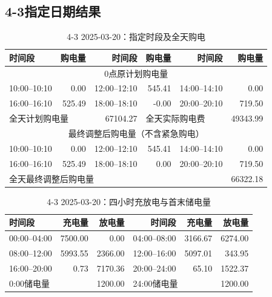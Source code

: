 \FloatBarrier
\subsection{4-3指定日期结果}
\begin{table}[htbp]\centering\scriptsize
\caption{4-3 2025-03-20：指定时段及全天购电}
\begin{tabular}{lrrrrr}\toprule
时间段 & 购电量 & 时间段 & 购电量 & 时间段 & 购电量\\\midrule
\multicolumn{6}{c}{0点原计划购电量}\\
10:00--10:10 & 0.00 & 12:00--12:10 & 545.41 & 14:00--14:10 & 0.00\\
16:00--16:10 & 525.49 & 18:00--18:10 & -0.00 & 20:00--20:10 & 719.50\\
\multicolumn{2}{l}{全天计划购电量} & 67104.27 & \multicolumn{2}{l}{全天实际购电费} & 49343.99\\
\multicolumn{6}{c}{最终调整后购电量（不含紧急购电）}\\
10:00--10:10 & 0.00 & 12:00--12:10 & 545.41 & 14:00--14:10 & 0.00\\
16:00--16:10 & 525.49 & 18:00--18:10 & 0.00 & 20:00--20:10 & 719.50\\
\multicolumn{5}{l}{全天最终调整后购电量} & 66322.18\\
\bottomrule\end{tabular}\end{table}

\begin{table}[htbp]\centering\scriptsize
\caption{4-3 2025-03-20：四小时充放电与首末储电量}
\begin{tabular}{lrrrrr}\toprule
时间段 & 充电量 & 放电量 & 时间段 & 充电量 & 放电量\\\midrule
00:00--04:00 & 7500.00 & 0.00 & 04:00--08:00 & 3166.67 & 6274.00\\
08:00--12:00 & 5993.55 & 2366.00 & 12:00--16:00 & 5097.01 & 343.95\\
16:00--20:00 & 0.73 & 7170.36 & 20:00--24:00 & 65.10 & 1522.37\\
\multicolumn{2}{l}{0:00储电量} & 1200.00 & \multicolumn{2}{l}{24:00储电量} & 1200.00\\
\bottomrule\end{tabular}\end{table}

